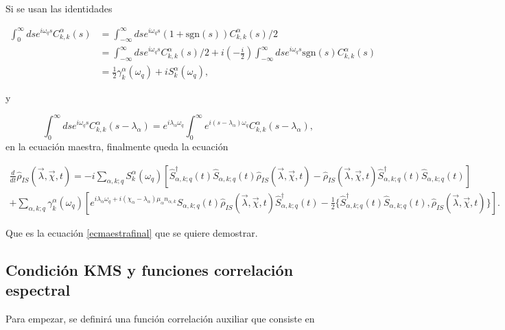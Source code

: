 \begin{appendixs}
Si se usan las identidades

\begin{align*}
    \int_{0}^{\infty}ds e^{i\omega_{q}s}C^{\alpha}_{k,k}(s) & = \int_{-\infty}^{\infty}ds e^{i\omega_{q}s}(1+\text{sgn}(s))C^{\alpha}_{k,k}(s)/2 \\
    & = \int_{-\infty}^{\infty}ds e^{i\omega_{q}s}C^{\alpha}_{k,k}(s)/2 + i \left(-\frac{i}{2} \right) \int_{-\infty}^{\infty}ds e^{i\omega_{q}s} \text{sgn}(s)C^{\alpha}_{k,k}(s) \\
    & = \frac{1}{2}\gamma_{k}^{\alpha}(\omega_{q}) + i S^{\alpha}_{k}(\omega_{q}),
\end{align*}

y 

\begin{equation*}
    \int_{0}^{\infty}dse^{i\omega_{q}s}C^{\alpha}_{k,k}(s-\lambda_{\alpha}) = e^{i\lambda_{\alpha}\omega_{q}}\int_{0}^{\infty}e^{i(s-\lambda_{\alpha})\omega_{q}}C^{\alpha}_{k,k}(s-\lambda_{\alpha}), 
\end{equation*}
en la ecuación maestra, finalmente queda la ecuación 

\begin{multline*}
    \frac{d}{dt}\hat{\rho}_{IS}(\vec{\lambda},\vec{\chi},t) = - i \sum_{\alpha,k;q}S^{\alpha}_{k}(\omega_{q})\left[\hat{S}^{\dagger}_{\alpha,k;q}(t)\hat{S}_{\alpha,k;q}(t)\hat{\rho}_{IS}(\vec{\lambda},\vec{\chi},t) - \hat{\rho}_{IS}(\vec{\lambda},\vec{\chi},t)\hat{S}^{\dagger}_{\alpha,k;q}(t)\hat{S}_{\alpha,k;q}(t) \right] \\
    + \sum_{\alpha,k;q} \gamma_{k}^{\alpha}(\omega_{q})\left[ e^{i\lambda_{\alpha}\omega_{q}+ i(\chi_{\alpha} - \lambda_{\alpha})\mu_{\alpha}n_{\alpha,k}}\hat{S}_{\alpha,k;q}(t)\hat{\rho}_{IS}(\vec{\lambda},\vec{\chi},t)\hat{S}^{\dagger}_{\alpha,k;q}(t) - \frac{1}{2}\{\hat{S}^{\dagger}_{\alpha,k;q}(t)\hat{S}_{\alpha,k;q}(t),\hat{\rho}_{IS}(\vec{\lambda},\vec{\chi},t) \} \right].
\end{multline*}

Que es la ecuación \ref{ecmaestrafinal} que se quiere demostrar.

\label{apendixGKLSgeneral}

\newpage


\subsection{Condición KMS y funciones correlación espectral}
Para empezar, se definirá una función correlación auxiliar que consiste en 


\end{appendixs}
